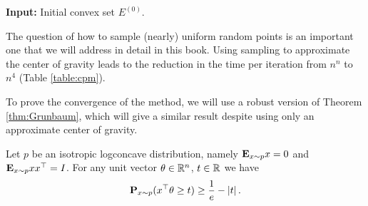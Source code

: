 \begin{algorithm2e}[H]

\caption{$\mathtt{RandomizedCenterOfGravity}$}\label{alg:randomized_cog}

\SetAlgoLined

\textbf{Input:} Initial convex set $E^{(0)}$.


\end{algorithm2e}
\begin{rem}
The question of how to sample (nearly) uniform random points is an
important one that we will address in detail in this book. Using sampling
to approximate the center of gravity leads to the reduction in the
time per iteration from $n^{n}$ to $n^{4}$ (Table \ref{table:cpm}).
\end{rem}

To prove the convergence of the method, we will use a robust version
of Theorem \ref{thm:Grunbaum}, which will give a similar result despite
using only an approximate center of gravity.
\begin{thm}
\label{thm:grun-1}Let $p$ be an isotropic logconcave distribution,
namely $\E_{x\sim p}x=0$ and $\E_{x\sim p}xx^{\top}=I$. For any
unit vector $\theta\in\R^{n}$, $t\in\R$ we have
\[
\P_{x\sim p}(x^{\top}\theta\geq t)\geq\frac{1}{e}-\left|t\right|.
\]
\end{thm}

